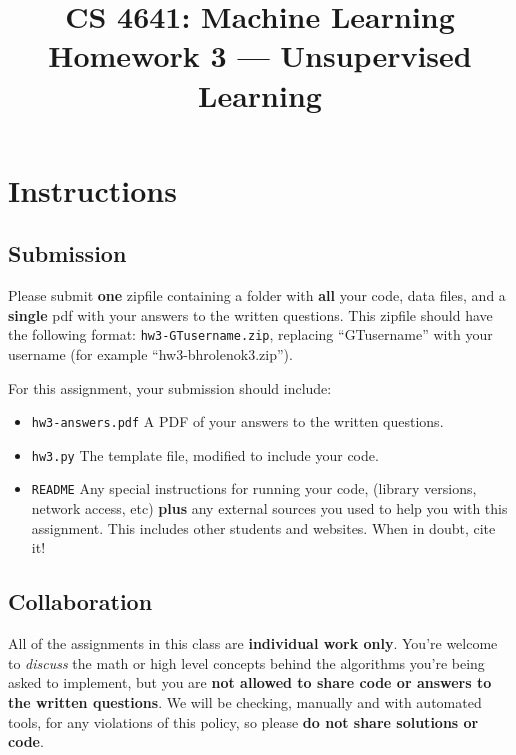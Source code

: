 \documentclass{article}
\title{CS 4641: Machine Learning\\
Homework 3 --- Unsupervised Learning}
\date{}
\author{}
\begin{document}
\maketitle

\newcommand{\bphnote}[1]{\textit{\textcolor{red}{#1}}}


\section*{Instructions} 
\subsection*{Submission}
Please submit \textbf{one} zipfile containing a folder with \textbf{all} your code, data files, and a 
\textbf{single} pdf with your answers to the written questions. This zipfile should have the following format: 
\texttt{hw3-GTusername.zip}, replacing ``GTusername'' with your username (for example ``hw3-bhrolenok3.zip'').

For this assignment, your submission should include:
\begin{itemize}
	\item \texttt{hw3-answers.pdf} A PDF of your answers to the written questions.
	\item \texttt{hw3.py} The template file, modified to include your code.
	\item \texttt{README} Any special instructions for running your code, (library versions, network access, etc) 
	\textbf{plus} any external sources you used to help you with this assignment. This includes other students and websites. 
	When in doubt, cite it!
\end{itemize}

\subsection*{Collaboration}
All of the assignments in this class are \textbf{individual work only}. You're welcome to \emph{discuss} the math or high 
level concepts behind the algorithms you're being asked to implement, but you are 
\textbf{not allowed to share code or answers to the written questions}. We will be checking, manually and with automated 
tools, for any violations of this policy, so please \textbf{do not share solutions or code}.
\end{document}
